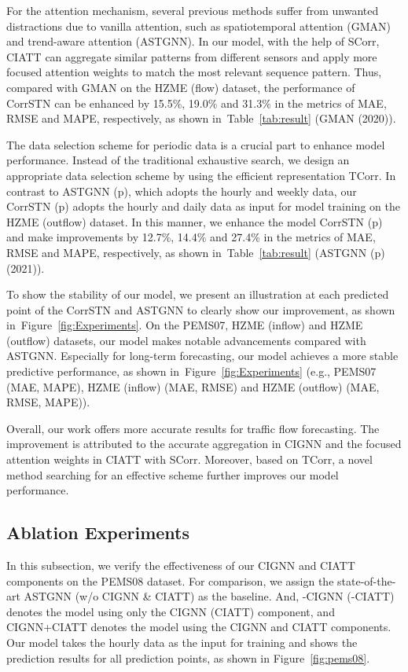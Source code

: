 \documentclass[sn-mathphys,iicol]{sn-jnl}
\newcommand\figref[1]{Figure~\ref{#1}}
\newcommand\tabref[1]{Table~\ref{#1}}
\theoremstyle{thmstyleone}\newtheorem{theorem}{Theorem}\newtheorem{proposition}[theorem]{Proposition}
\theoremstyle{thmstyletwo}\newtheorem{example}{Example}\newtheorem{remark}{Remark}
\theoremstyle{thmstylethree}\newtheorem{definition}{Definition}
\begin{document}
For the attention mechanism, several previous methods suffer from unwanted distractions due to vanilla attention, such as spatiotemporal attention (GMAN) and trend-aware attention (ASTGNN). In our model, with the help of SCorr, CIATT can aggregate similar patterns from different sensors and apply more focused attention weights to match the most relevant sequence pattern. Thus, compared with GMAN on the HZME (flow) dataset, the performance of CorrSTN can be enhanced by 15.5\%, 19.0\% and 31.3\% in the metrics of MAE, RMSE and MAPE, respectively, as shown in~\tabref{tab:result} (GMAN (2020)).

The data selection scheme for periodic data is a crucial part to enhance model performance. Instead of the traditional exhaustive search, we design an appropriate data selection scheme by using the efficient representation TCorr. In contrast to ASTGNN (p), which adopts the hourly and weekly data, our CorrSTN (p) adopts the hourly and daily data as input for model training on the HZME (outflow) dataset. In this manner, we enhance the model CorrSTN (p) and make improvements by 12.7\%, 14.4\% and 27.4\% in the metrics of MAE, RMSE and MAPE, respectively, as shown in~\tabref{tab:result} (ASTGNN (p) (2021)).

To show the stability of our model, we present an illustration at each predicted point of the CorrSTN and ASTGNN to clearly show our improvement, as shown in~\figref{fig:Experiments}. On the PEMS07, HZME (inflow) and HZME (outflow) datasets, our model makes notable advancements compared with ASTGNN. Especially for long-term forecasting, our model achieves a more stable predictive performance, as shown in~\figref{fig:Experiments} (e.g., PEMS07 (MAE, MAPE), HZME (inflow) (MAE, RMSE) and HZME (outflow) (MAE, RMSE, MAPE)).

Overall, our work offers more accurate results for traffic flow forecasting. The improvement is attributed to the accurate aggregation in CIGNN and the focused attention weights in CIATT with SCorr. Moreover, based on TCorr, a novel method searching for an effective scheme further improves our model performance.



\subsection{Ablation Experiments}

In this subsection, we verify the effectiveness of our CIGNN and CIATT components on the PEMS08 dataset. For comparison, we assign the state-of-the-art ASTGNN (w/o CIGNN \& CIATT) as the baseline. And, -CIGNN (-CIATT) denotes the model using only the CIGNN (CIATT) component, and CIGNN+CIATT denotes the model using the CIGNN and CIATT components. Our model takes the hourly data as the input for training and shows the prediction results for all prediction points, as shown in \figref{fig:pems08}. 
\end{document}
